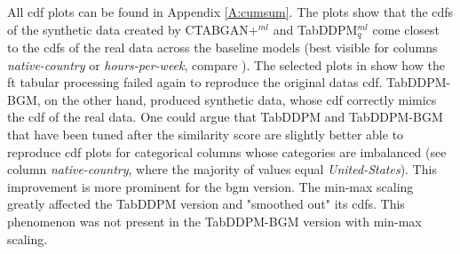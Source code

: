 All \gls{cdf} plots can be found in Appendix \ref{A:cumsum}.
The plots show that the \glspl{cdf} of the synthetic data created by CTABGAN+$^{ml}$ and TabDDPM$^{ml}_q$ come closest to
the \glspl{cdf} of the real data across the baseline models (best visible for columns \textit{native-country} or \textit{hours-per-week}, compare ).
The selected plots in  show how the \gls{ft} tabular processing failed again to reproduce the original datas \gls{cdf}.
TabDDPM-BGM, on the other hand, produced synthetic data, whose \gls{cdf} correctly mimics the \gls{cdf} of the real data.
One could argue that TabDDPM and TabDDPM-BGM that have been tuned after the similarity score are slightly better able to
reproduce \gls{cdf} plots for categorical columns whose categories are imbalanced (\eg see column \textit{native-country}, where the majority of values equal \textit{United-States}).
This improvement is more prominent for the \gls{bgm} version.
The min-max scaling greatly affected the TabDDPM version and "smoothed out" its \glspl{cdf}.
This phenomenon was not present in the TabDDPM-BGM version with min-max scaling.

